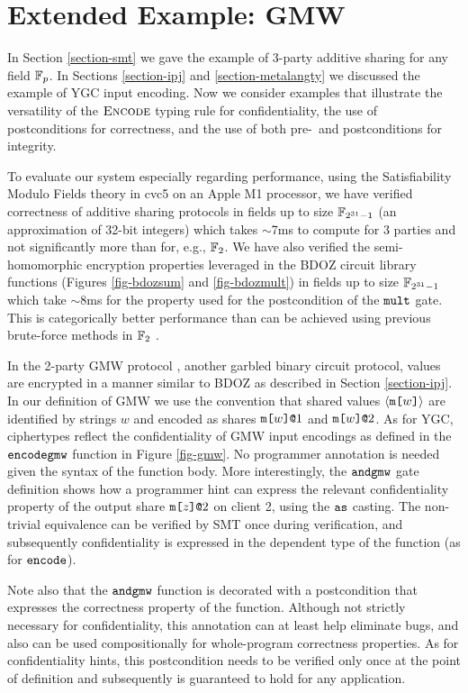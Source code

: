 \section{Extended Example: GMW}
\label{section-examples}

In Section \ref{section-smt} we gave the example of 3-party additive
sharing for any field $\mathbb{F}_{p}$. In Sections \ref{section-ipj} and
\ref{section-metalangty} we discussed the example of YGC input encoding.
Now we consider examples that illustrate the versatility of the
$\text{\sc Encode}$ typing rule for confidentiality, the use of
postconditions for correctness, and the use of both pre-~and
postconditions for integrity.

To evaluate our system especially regarding performance, using the
Satisfiability Modulo Fields theory in cvc5 on an Apple M1 processor,
we have verified correctness of additive sharing protocols in fields
up to size $\mathbb{F}_{2^{31} - 1}$ (an approximation of 32-bit integers)
which takes $\sim$7ms to compute for 3 parties and not significantly more
than for, e.g., $\mathbb{F}_{2}$. We have also verified the semi-homomorphic
encryption properties leveraged in the BDOZ circuit library functions
(Figures \ref{fig-bdozsum} and \ref{fig-bdozmult}) in fields up to
size $\mathbb{F}_{2^{31} - 1}$ which take $\sim$8ms for the property used for
the postcondition of the $\texttt{mult}$ gate. This is categorically
better performance than can be achieved using previous brute-force
methods in $\mathbb{F}_{2}$ \cite{skalka-near-ppdp24}.



In the 2-party GMW protocol \cite{evans2018pragmatic}, another garbled
binary circuit protocol, values are encrypted in a manner similar to
BDOZ as described in Section \ref{section-ipj}. In our definition of
GMW we use the convention that shared values $\langle \texttt{m[}w\texttt{]} \rangle$ are
identified by strings $w$ and encoded as shares $\texttt{m[}w\texttt{]}\texttt{@}1$ and
$\texttt{m[}w\texttt{]}\texttt{@}2$.  As for YGC, ciphertypes reflect the confidentiality of
GMW input encodings as defined in the $\texttt{encodegmw}$ function in
Figure \ref{fig-gmw}. No programmer annotation is needed given the
syntax of the function body. More interestingly, the $\texttt{andgmw}$
gate definition shows how a programmer hint can express the relevant
confidentiality property of the output share $\texttt{m[}z\texttt{]}\texttt{@}2$ on client 2,
using the $\texttt{as}$ casting. The non-trivial equivalence can be
verified by SMT once during verification, and subsequently
confidentiality is expressed in the dependent type of the function (as
for $\texttt{encode}$).

Note also that the $\texttt{andgmw}$ function is decorated with a
postcondition that expresses the correctness property of the
function. Although not strictly necessary for confidentiality, this
annotation can at least help eliminate bugs, and also can be used
compositionally for whole-program correctness properties. As for
confidentiality hints, this postcondition needs to be verified only
once at the point of definition and subsequently is guaranteed to hold
for any application.
